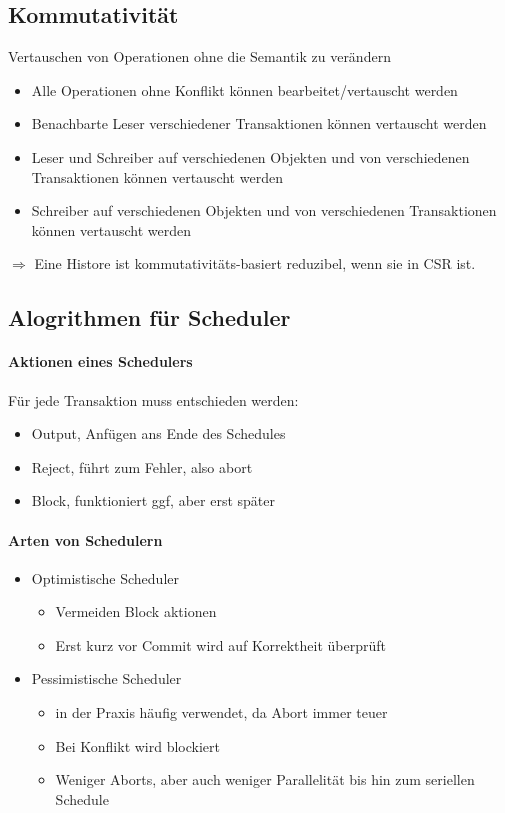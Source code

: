 \documentclass[ngerman]{scrartcl}
\begin{document}
\subsection{Kommutativität}
Vertauschen von Operationen ohne die Semantik zu verändern
\begin{itemize}
  \item Alle Operationen ohne Konflikt können bearbeitet/vertauscht werden
  \item Benachbarte Leser verschiedener Transaktionen können vertauscht werden
  \item Leser und Schreiber auf verschiedenen Objekten und von verschiedenen Transaktionen können vertauscht werden
  \item Schreiber auf verschiedenen Objekten und von verschiedenen Transaktionen können vertauscht werden
\end{itemize}
$ \Rightarrow $ Eine Histore ist kommutativitäts-basiert reduzibel, wenn sie in CSR ist.



\subsection{Alogrithmen für Scheduler}
\paragraph{Aktionen eines Schedulers}
Für jede Transaktion muss entschieden werden:
\begin{itemize}
  \item Output, Anfügen ans Ende des Schedules
  \item Reject, führt zum Fehler, also abort
  \item Block, funktioniert ggf, aber erst später
\end{itemize}

\paragraph{Arten von Schedulern}
\begin{itemize}
  \item Optimistische Scheduler
  \begin{itemize}
    \item Vermeiden Block aktionen
    \item Erst kurz vor Commit wird auf Korrektheit überprüft
  \end{itemize}
  \item Pessimistische Scheduler
  \begin{itemize}
    \item in der Praxis häufig verwendet, da Abort immer teuer
    \item Bei Konflikt wird blockiert
    \item Weniger Aborts, aber auch weniger Parallelität bis hin zum seriellen Schedule
  \end{itemize}
\end{itemize}
\end{document}
